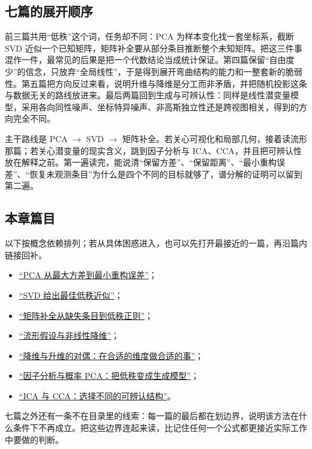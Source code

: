 \subsection{七篇的展开顺序}

前三篇共用``低秩''这个词，任务却不同：PCA 为样本变化找一套坐标系，截断 SVD 近似一个已知矩阵，矩阵补全要从部分条目推断整个未知矩阵。把这三件事混作一件，最常见的后果是把一个代数结论当成统计保证。第四篇保留``自由度少''的信念，只放弃``全局线性''，于是得到展开弯曲结构的能力和一整套新的脆弱性。第五篇把方向反过来看，说明升维与降维是分工而非矛盾，并把随机投影这条与数据无关的路线放进来。最后两篇回到生成与可辨认性：同样是线性潜变量模型，采用各向同性噪声、坐标特异噪声、非高斯独立性还是跨视图相关，得到的方向完全不同。

主干路线是 PCA \(\rightarrow\) SVD \(\rightarrow\) 矩阵补全。若关心可视化和局部几何，接着读流形那篇；若关心潜变量的现实含义，跳到因子分析与 ICA、CCA，并且把可辨认性放在解释之前。第一遍读完，能说清``保留方差''、``保留距离''、``最小重构误差''、``恢复未观测条目''为什么是四个不同的目标就够了，谱分解的证明可以留到第二遍。

\subsection{本章篇目}

以下按概念依赖排列；若从具体困惑进入，也可以先打开最接近的一篇，再沿篇内链接回补。

\begin{itemize}
\tightlist
\item \hyperref[sec:13-Machine-Learning/04-Dimensionality-Reduction/01]{``PCA 从最大方差到最小重构误差''}；
\item \hyperref[sec:13-Machine-Learning/04-Dimensionality-Reduction/02]{``SVD 给出最佳低秩近似''}；
\item \hyperref[sec:13-Machine-Learning/04-Dimensionality-Reduction/03]{``矩阵补全从缺失条目到低秩正则''}；
\item \hyperref[sec:13-Machine-Learning/04-Dimensionality-Reduction/04]{``流形假设与非线性降维''}；
\item \hyperref[sec:13-Machine-Learning/04-Dimensionality-Reduction/05]{``降维与升维的对偶：在合适的维度做合适的事''}；
\item \hyperref[sec:13-Machine-Learning/04-Dimensionality-Reduction/06]{``因子分析与概率 PCA：把低秩变成生成模型''}；
\item \hyperref[sec:13-Machine-Learning/04-Dimensionality-Reduction/07]{``ICA 与 CCA：选择不同的可辨认结构''}。
\end{itemize}

七篇之外还有一条不在目录里的线索：每一篇的最后都在划边界，说明该方法在什么条件下不再成立。把这些边界连起来读，比记住任何一个公式都更接近实际工作中要做的判断。
